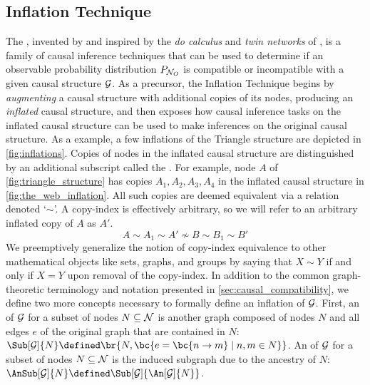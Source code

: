 \documentclass[aps, 10pt, english, twoside, pra, nofootinbib, tightenlines, longbibliography, superscriptaddress]{revtex4-1}
\begin{document}
    \subsection{Inflation Technique}
    \label{sec:deriving_inequalities}
    \label{sec:inflation_technique_main_summary}
    The , invented by \citet{Inflation} and inspired by the \textit{do calculus} and \textit{twin networks} of \citet{Pearl_2009}, is a family of causal inference techniques that can be used to determine if an observable probability distribution $\prob[\nodes_{O}]$ is compatible or incompatible with a given causal structure $\mathcal{G}$. As a precursor, the Inflation Technique begins by \textit{augmenting} a causal structure with additional copies of its nodes, producing an \textit{inflated} causal structure, and then exposes how causal inference tasks on the inflated causal structure can be used to make inferences on the original causal structure. As a example, a few inflations of the Triangle structure are depicted in \cref{fig:inflations}. Copies of nodes in the inflated causal structure are distinguished by an additional subscript called the . For example, node $A$ of \cref{fig:triangle_structure} has copies $A_1, A_2, A_3, A_4$ in the inflated causal structure in \cref{fig:the_web_inflation}. All such copies are deemed equivalent via a  relation denoted `$\sim$'. A copy-index is effectively arbitrary, so we will refer to an arbitrary inflated copy of $A$ as $A'$.
    \[ A \sim A_1 \sim A' \not\sim B \sim B_1 \sim B' \]
    We preemptively generalize the notion of copy-index equivalence to other mathematical objects like sets, graphs, and groups by saying that $X \sim Y$ if and only if $X = Y$ upon removal of the copy-index. In addition to the common graph-theoretic terminology and notation presented in \cref{sec:causal_compatibility}, we define two more concepts necessary to formally define an inflation of $\mathcal{G}$. First, an  of $\mathcal{G}$ for a subset of nodes $N \subseteq \mathcal{N}$ is another graph composed of nodes $N$ and all edges $e$ of the original graph that are contained in $N$: $\Sub[\graph]{N} \defined \br{N, \bc{e = \bc{n \to m} \mid n, m \in N}}$. An  of $\mathcal{G}$ for a subset of nodes $N \subseteq \mathcal{N}$ is the induced subgraph due to the ancestry of $N$: $\AnSub[\graph]{N} \defined \Sub[\graph]{\An[\graph]{N}}$.
\end{document}
